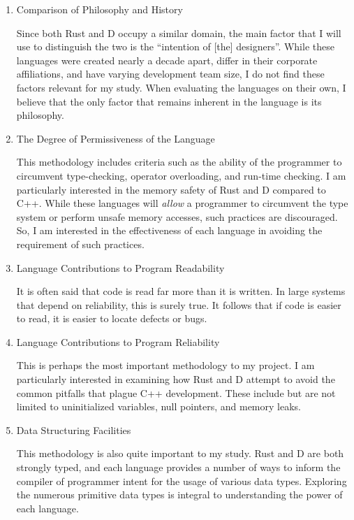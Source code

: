 \documentclass[draftcopy,nolof,nolot]{srpaper}
\begin{document}
\begin{enumerate}
\item Comparison of Philosophy and History

Since both Rust and D occupy a similar domain, the main factor that I will use
to distinguish the two is the ``intention of [the] designers''. While these
languages were created nearly a decade apart, differ in their corporate
affiliations, and have varying development team size, I do not find these
factors relevant for my study. When evaluating the languages on their own, I
believe that the only factor that remains inherent in the language is its
philosophy.

\item The Degree of Permissiveness of the Language

This methodology includes criteria such as the ability of the programmer to
circumvent type-checking, operator overloading, and run-time checking. I am
particularly interested in the memory safety of Rust and D compared to C++.
While these languages will \textit{allow} a programmer to circumvent the type
system or perform unsafe memory accesses, such practices are discouraged. So,
I am interested in the effectiveness of each language in avoiding the
requirement of such practices.

\item Language Contributions to Program Readability

It is often said that code is read far more than it is written. In large
systems that depend on reliability, this is surely true. It follows that if
code is easier to read, it is easier to locate defects or bugs.

\item Language Contributions to Program Reliability

This is perhaps the most important methodology to my project. I am particularly
interested in examining how Rust and D attempt to avoid the common pitfalls
that plague C++ development. These include but are not limited to uninitialized
variables, null pointers, and memory leaks.

\item Data Structuring Facilities

This methodology is also quite important to my study. Rust and D are both
strongly typed, and each language provides a number of ways to inform the
compiler of programmer intent for the usage of various data types. Exploring
the numerous primitive data types is integral to understanding the power of
each language.


\end{enumerate}
\end{document}
